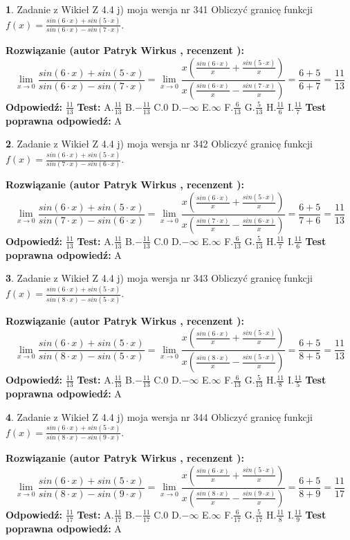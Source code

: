 \documentclass[12pt, a4paper]{article}
\theoremstyle{definition} %
\newtheorem{zad}{}
\newcommand{\zadStart}[1]{\begin{zad}#1\newline}
\newcommand{\zadStop}{\end{zad}}
\newcommand{\rozwStart}[2]{\noindent \textbf{Rozwiązanie (autor #1 , recenzent #2): }\newline}
\newcommand{\rozwStop}{\newline}
\newcommand{\odpStart}{\noindent \textbf{Odpowiedź:}\newline}
\newcommand{\odpStop}{\newline}
\newcommand{\testStart}{\noindent \textbf{Test:}\newline}
\newcommand{\testStop}{\newline}
\newcommand{\kluczStart}{\noindent \textbf{Test poprawna odpowiedź:}\newline}
\newcommand{\kluczStop}{\newline}
\begin{document}
\zadStart{Zadanie z Wikieł Z 4.4 j) moja wersja nr 341}
Obliczyć granicę funkcji $f(x)=\frac{sin(6\cdot x) +sin(5\cdot x)}{sin(6\cdot x) -sin(7\cdot x)}$.
\zadStop
\rozwStart{Patryk Wirkus}{}
$$\lim\limits_{x\to 0}\frac{sin(6\cdot x) +sin(5\cdot x)}{sin(6\cdot x) -sin(7\cdot x)}=\lim\limits_{x\to 0}\frac{x(\frac{sin(6\cdot x)}{x}+\frac{sin(5\cdot x)}{x})}{x(\frac{sin(6\cdot x)}{x}-\frac{sin(7\cdot x)}{x})}=\frac{6+5}{6+7} = \frac{11}{13}$$
\rozwStop
\odpStart
$\frac{11}{13}$
\odpStop
\testStart
A.$\frac{11}{13}$
B.$-\frac{11}{13}$
C.$0$
D.$-\infty$
E.$\infty$
F.$\frac{6}{13}$
G.$\frac{5}{13}$
H.$\frac{11}{6}$
I.$\frac{11}{7}$
\testStop
\kluczStart
A
\kluczStop



\zadStart{Zadanie z Wikieł Z 4.4 j) moja wersja nr 342}
Obliczyć granicę funkcji $f(x)=\frac{sin(6\cdot x) +sin(5\cdot x)}{sin(7\cdot x) -sin(6\cdot x)}$.
\zadStop
\rozwStart{Patryk Wirkus}{}
$$\lim\limits_{x\to 0}\frac{sin(6\cdot x) +sin(5\cdot x)}{sin(7\cdot x) -sin(6\cdot x)}=\lim\limits_{x\to 0}\frac{x(\frac{sin(6\cdot x)}{x}+\frac{sin(5\cdot x)}{x})}{x(\frac{sin(7\cdot x)}{x}-\frac{sin(6\cdot x)}{x})}=\frac{6+5}{7+6} = \frac{11}{13}$$
\rozwStop
\odpStart
$\frac{11}{13}$
\odpStop
\testStart
A.$\frac{11}{13}$
B.$-\frac{11}{13}$
C.$0$
D.$-\infty$
E.$\infty$
F.$\frac{6}{13}$
G.$\frac{5}{13}$
H.$\frac{11}{7}$
I.$\frac{11}{6}$
\testStop
\kluczStart
A
\kluczStop



\zadStart{Zadanie z Wikieł Z 4.4 j) moja wersja nr 343}
Obliczyć granicę funkcji $f(x)=\frac{sin(6\cdot x) +sin(5\cdot x)}{sin(8\cdot x) -sin(5\cdot x)}$.
\zadStop
\rozwStart{Patryk Wirkus}{}
$$\lim\limits_{x\to 0}\frac{sin(6\cdot x) +sin(5\cdot x)}{sin(8\cdot x) -sin(5\cdot x)}=\lim\limits_{x\to 0}\frac{x(\frac{sin(6\cdot x)}{x}+\frac{sin(5\cdot x)}{x})}{x(\frac{sin(8\cdot x)}{x}-\frac{sin(5\cdot x)}{x})}=\frac{6+5}{8+5} = \frac{11}{13}$$
\rozwStop
\odpStart
$\frac{11}{13}$
\odpStop
\testStart
A.$\frac{11}{13}$
B.$-\frac{11}{13}$
C.$0$
D.$-\infty$
E.$\infty$
F.$\frac{6}{13}$
G.$\frac{5}{13}$
H.$\frac{11}{8}$
I.$\frac{11}{5}$
\testStop
\kluczStart
A
\kluczStop



\zadStart{Zadanie z Wikieł Z 4.4 j) moja wersja nr 344}
Obliczyć granicę funkcji $f(x)=\frac{sin(6\cdot x) +sin(5\cdot x)}{sin(8\cdot x) -sin(9\cdot x)}$.
\zadStop
\rozwStart{Patryk Wirkus}{}
$$\lim\limits_{x\to 0}\frac{sin(6\cdot x) +sin(5\cdot x)}{sin(8\cdot x) -sin(9\cdot x)}=\lim\limits_{x\to 0}\frac{x(\frac{sin(6\cdot x)}{x}+\frac{sin(5\cdot x)}{x})}{x(\frac{sin(8\cdot x)}{x}-\frac{sin(9\cdot x)}{x})}=\frac{6+5}{8+9} = \frac{11}{17}$$
\rozwStop
\odpStart
$\frac{11}{17}$
\odpStop
\testStart
A.$\frac{11}{17}$
B.$-\frac{11}{17}$
C.$0$
D.$-\infty$
E.$\infty$
F.$\frac{6}{17}$
G.$\frac{5}{17}$
H.$\frac{11}{8}$
I.$\frac{11}{9}$
\testStop
\kluczStart
A
\kluczStop
\end{document}
